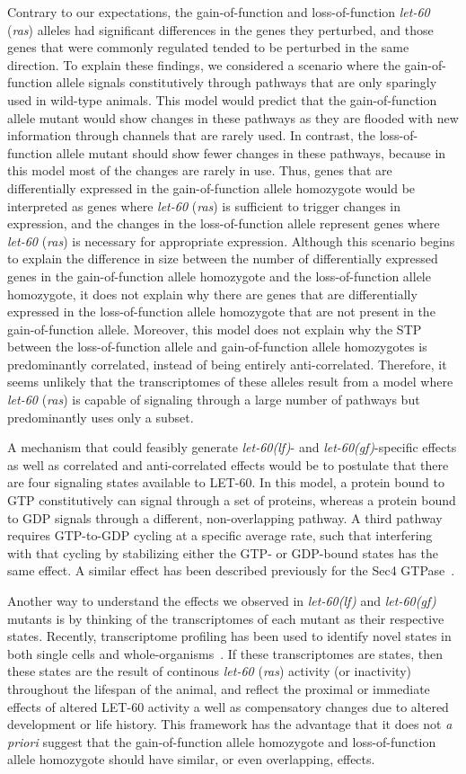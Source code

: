 \documentclass[10pt, onecolumn]{article}
\newcommand{\gf}{gain-of-function allele}
\newcommand{\lf}{loss-of-function allele}
\newcommand{\gene}[1]{\mbox{\emph{#1}}}
\newcommand{\protein}[1]{\mbox{\uppercase{#1}}}
\newcommand{\ras}{\gene{let-60} (\emph{ras})}
\newcommand{\rasp}{\protein{let-60}}
\newcommand{\letgf}{\gene{let-60(gf)}}
\newcommand{\letlf}{\gene{let-60(lf)}}
\begin{document}
Contrary to our expectations, the gain-of-function and loss-of-function \ras{}
alleles had significant differences in the genes they perturbed, and those genes
that were commonly regulated tended to be perturbed in the same direction. To
explain these findings, we considered a scenario where the \gf{} signals
constitutively through pathways that are only sparingly used in wild-type
animals. This model would predict that the \gf{} mutant would show changes in
these pathways as they are flooded with new information through channels that
are rarely used. In contrast, the \lf{} mutant should show fewer changes in
these pathways, because in this model most of the changes are rarely in use.
Thus, genes that are differentially expressed in the \gf{} homozygote would be
interpreted as genes where \ras{} is sufficient to trigger changes in
expression, and the changes in the \lf{} represent genes where \ras{} is
necessary for appropriate expression. Although this scenario begins to explain
the difference in size between the number of differentially expressed genes in
the \gf{} homozygote and the \lf{} homozygote, it does not explain why there are
genes that are differentially expressed in the \lf{} homozygote that are not
present in the \gf{}. Moreover, this model does not explain why the STP between
the \lf{} and \gf{} homozygotes is predominantly correlated, instead of being
entirely anti-correlated. Therefore, it seems unlikely that the transcriptomes
of these alleles result from a model where \ras{} is capable of signaling
through a large number of pathways but predominantly uses only a subset.

A mechanism that could feasibly generate \letlf{}- and \letgf{}-specific effects
as well as correlated and anti-correlated effects would be to postulate that
there are four signaling states available to \rasp{}. In this model, a protein
bound to GTP constitutively can signal through a set of proteins, whereas a
protein bound to GDP signals through a different, non-overlapping pathway. A
third pathway requires GTP-to-GDP cycling at a specific average rate, such that
interfering with that cycling by stabilizing either the GTP- or GDP-bound states
has the same effect. A similar effect has been described previously for the Sec4
GTPase~\cite{}.

Another way to understand the effects we observed in \letlf{} and \letgf{}
mutants is by thinking of the transcriptomes of each mutant as their respective
states. Recently, transcriptome profiling has been used to identify novel states
in both single cells and whole-organisms~\cite{Angeles-Albores2017,Villani2017}.
If these transcriptomes are states, then these states are the result of
continous \ras{} activity (or inactivity) throughout the lifespan of the animal,
and reflect the proximal or immediate effects of altered \rasp{} activity a well
as compensatory changes due to altered development or life history. This
framework has the advantage that it does not \emph{a priori} suggest that the
\gf{} homozygote and \lf{} homozygote should have similar, or even overlapping,
effects.
\end{document}

